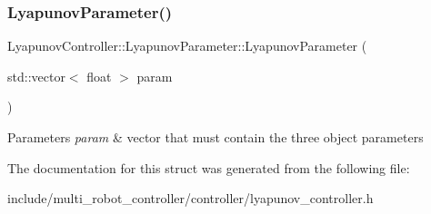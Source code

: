 \subsubsection{\texorpdfstring{Lyapunov\+Parameter()}{LyapunovParameter()}}
{\footnotesize\ttfamily Lyapunov\+Controller\+::\+Lyapunov\+Parameter\+::\+Lyapunov\+Parameter (\begin{DoxyParamCaption}\item[{std\+::vector$<$ float $>$}]{param }\end{DoxyParamCaption})\hspace{0.3cm}{\ttfamily [inline]}}


\begin{DoxyParams}{Parameters}
{\em param} & vector that must contain the three object parameters \\
\hline
\end{DoxyParams}


The documentation for this struct was generated from the following file\+:\begin{DoxyCompactItemize}
\item 
include/multi\+\_\+robot\+\_\+controller/controller/lyapunov\+\_\+controller.\+h\end{DoxyCompactItemize}
